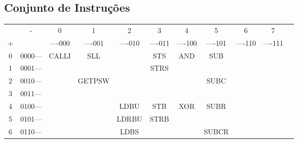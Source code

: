 \documentclass[
	article,			%
	11pt,				%
	oneside,			%
	a4paper,			%
	english,			%
	brazil,				%
	sumario=tradicional
	]{abntex2}
\begin{document}
\subsection{Conjunto de Instruções}

\begin{table}[!htp]\centering
\scriptsize
\begin{tabular}{ccccccccccc}\toprule
\cellcolor[HTML]{b7b7b7} &\cellcolor[HTML]{b7b7b7}- &0 &1 &2 &3 &4 &5 &6 &7 \\
\cellcolor[HTML]{b7b7b7}+ &\cellcolor[HTML]{b7b7b7} &----000 &\cellcolor[HTML]{d9ead3}----001 &----010 &\cellcolor[HTML]{d9ead3}----011 &----100 &\cellcolor[HTML]{d9ead3}----101 &----110 &\cellcolor[HTML]{d9ead3}----111 \\\midrule
0 &0000--- &\cellcolor[HTML]{b4a7d6}CALLI &\cellcolor[HTML]{9fc5e8}SLL &\cellcolor[HTML]{cc0000} &\cellcolor[HTML]{ead1dc}STS &\cellcolor[HTML]{c9daf8}AND &\cellcolor[HTML]{d0e0e3}SUB &\cellcolor[HTML]{351c75}\textcolor{white}{RET} &\cellcolor[HTML]{a61c00}\textcolor{white}{LDHI} \\
1 &\cellcolor[HTML]{d9ead3}0001--- &\cellcolor[HTML]{b4a7d6} &\cellcolor[HTML]{9fc5e8} &\cellcolor[HTML]{cc0000} &\cellcolor[HTML]{d5a6bd}STRS &\cellcolor[HTML]{c9daf8} &\cellcolor[HTML]{d0e0e3} &\cellcolor[HTML]{351c75} &\cellcolor[HTML]{a61c00} \\
2 &0010--- &\cellcolor[HTML]{b4a7d6} &\cellcolor[HTML]{93c47d}GETPSW &\cellcolor[HTML]{cc0000} &\cellcolor[HTML]{ead1dc} &\cellcolor[HTML]{c9daf8} &\cellcolor[HTML]{a2c4c9}SUBC &\cellcolor[HTML]{351c75} &\cellcolor[HTML]{a61c00} \\
3 &\cellcolor[HTML]{d9ead3}0011--- &\cellcolor[HTML]{b4a7d6} &\cellcolor[HTML]{93c47d} &\cellcolor[HTML]{cc0000} &\cellcolor[HTML]{d5a6bd} &\cellcolor[HTML]{c9daf8} &\cellcolor[HTML]{a2c4c9} &\cellcolor[HTML]{351c75} &\cellcolor[HTML]{a61c00} \\
4 &0100--- &\cellcolor[HTML]{b4a7d6} &\cellcolor[HTML]{9fc5e8} &\cellcolor[HTML]{fce5cd}LDBU &\cellcolor[HTML]{c27ba0}STB &\cellcolor[HTML]{a4c2f4}XOR &\cellcolor[HTML]{76a5af}SUBR &\cellcolor[HTML]{20124d}\textcolor{white}{RETI} &\cellcolor[HTML]{a61c00} \\
5 &\cellcolor[HTML]{d9ead3}0101--- &\cellcolor[HTML]{b4a7d6} &\cellcolor[HTML]{9fc5e8} &\cellcolor[HTML]{f9cb9c}LDRBU &\cellcolor[HTML]{a64d79}STRB &\cellcolor[HTML]{a4c2f4} &\cellcolor[HTML]{76a5af} &\cellcolor[HTML]{20124d} &\cellcolor[HTML]{a61c00} \\
6 &0110--- &\cellcolor[HTML]{b4a7d6} &\cellcolor[HTML]{93c47d} &\cellcolor[HTML]{f6b26b}LDBS &\cellcolor[HTML]{c27ba0} &\cellcolor[HTML]{a4c2f4} &\cellcolor[HTML]{45818e}SUBCR &\cellcolor[HTML]{20124d} &\cellcolor[HTML]{a61c00} \\

\end{tabular}
\end{table}
\end{document}
